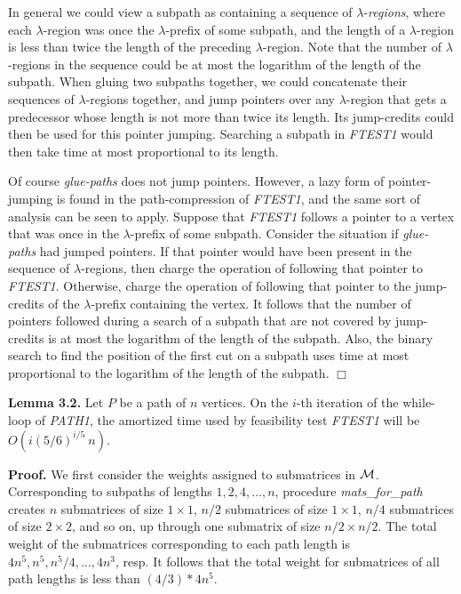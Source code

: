 {{{In general we could view a subpath as containing a sequence of
$\lambda$-{\it regions},
where each $\lambda$-region was once the $\lambda$-prefix of some subpath,
and the length of a $\lambda$-region is less than twice the length
of the preceding $\lambda$-region.
Note that the number of $\lambda$-regions in the sequence could be at most
the logarithm of the length of the subpath.
When gluing two subpaths together,
we could concatenate their sequences of $\lambda$-regions together,
and jump pointers over any $\lambda$-region that gets a predecessor
whose length is not more than twice its length.
Its jump-credits could then be used for this pointer jumping.
Searching a subpath in {\it FTEST1} would then take
time at most proportional to its length.

Of course {\it glue-paths} does not jump pointers.
However,
a lazy form of pointer-jumping is found in the path-compression of {\it FTEST1},
and the same sort of analysis can be seen to apply.
Suppose that {\it FTEST1} follows a pointer to a vertex
that was once in the $\lambda$-prefix of some subpath.
Consider the situation if {\it glue-paths} had jumped pointers.
If that pointer would have been present in the sequence of $\lambda$-regions,
then charge the operation of following that pointer to {\it FTEST1}.
Otherwise, charge the operation of following that pointer
to the jump-credits of the $\lambda$-prefix containing the vertex.
It follows that the number of pointers followed during a search
of a subpath that are not covered by jump-credits is at most
the logarithm of the length of the subpath.
Also, the binary search to find the position of the first cut
on a subpath uses time at most proportional
to the logarithm of the length of the subpath.
$\Box$

\bigskip

\noindent
{\bf Lemma 3.2.}
Let $P$ be a path of $n$ vertices.
On the $i$-th iteration of the while-loop of {\it PATH1},
the amortized time used by feasibility test {\it FTEST1}
will be $O(i(5/6)^{i/5}\:n)$.

\noindent
{\bf Proof.}
We first consider the weights assigned to submatrices in $\cal M$.
Corresponding to subpaths of lengths $1, 2, 4, \ldots , n$,
procedure {\it mats\_for\_path} creates
$n$ submatrices of size $1 \times 1$,
$n/2$ submatrices of size $1 \times 1$,
$n/4$ submatrices of size $2 \times 2$, and so on,
up through one submatrix of size $n/2 \times n/2$.
The total weight of the submatrices corresponding to each path length is
$4n^5, n^5, n^5/4, \ldots , 4n^3$, resp.
It follows that the total weight for submatrices of all path lengths is
less than $(4/3)*4n^5$.

}}}
